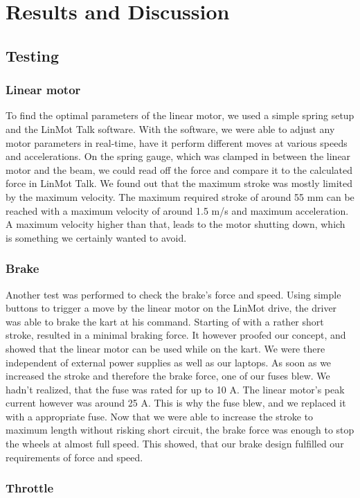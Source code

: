 
\chapter{Results and Discussion}
\label{chp:Results}

\section{Testing}

\subsection{Linear motor}

To find the optimal parameters of the linear motor, we used a simple spring setup and the LinMot Talk software. With the software, we were able to adjust any motor parameters in real-time, have it perform different moves at various speeds and accelerations. On the spring gauge, which was clamped in between the linear motor and the beam, we could read off the force and compare it to the calculated force in LinMot Talk. We found out that the maximum stroke was mostly limited by the maximum velocity. The maximum required stroke of around 55 mm can be reached with a maximum velocity of around 1.5 m/s and maximum acceleration. A maximum velocity higher than that, leads to the motor shutting down, which is something we certainly wanted to avoid.

\subsection{Brake}
Another test was performed to check the brake's force and speed. Using simple buttons to trigger a move by the linear motor on the LinMot drive, the driver was able to brake the kart at his command. Starting of with a rather short stroke, resulted in a minimal braking force. It however proofed our concept, and showed that the linear motor can be used while on the kart. We were there independent of external power supplies as well as our laptops. As soon as we increased the stroke and therefore the brake force, one of our fuses blew. We hadn't realized, that the fuse was rated for up to 10 A. The linear motor's peak current however was around 25 A. This is why the fuse blew, and we replaced it with a appropriate fuse. Now that we were able to increase the stroke to maximum length without risking short circuit, the brake force was enough to stop the wheels at almost full speed. This showed, that our brake design fulfilled our requirements of force and speed. 

\subsection{Throttle}

